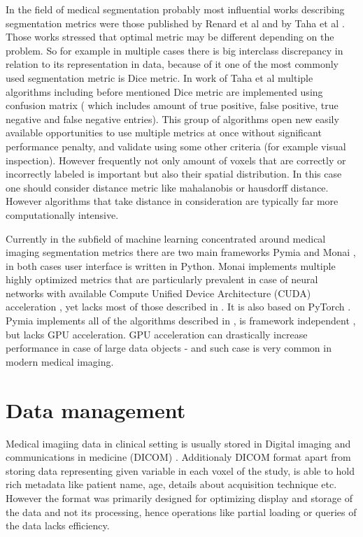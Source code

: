 \documentclass{juliacon}
\begin{document}
In the field of medical segmentation probably most influential works describing segmentation metrics were those published by Renard et al \cite{Nature} and by Taha et al \cite{TahaMainSegm}. Those works stressed that optimal metric may be different depending on the problem. So for example in multiple cases there is big interclass discrepancy in relation to its representation in data, because of it one of the most commonly used segmentation metric is Dice metric. In work of Taha et al \cite{TahaMainSegm} multiple algorithms including before mentioned Dice metric are implemented using confusion matrix ( which includes amount of true positive, false positive, true negative and false negative entries). This group of algorithms open new easily available opportunities to use multiple metrics at once without significant performance penalty, and validate using some other criteria (for example visual inspection). However frequently not only amount of voxels that are correctly or incorrectly labeled is important but also their spatial distribution. In this case one should consider distance metric like mahalanobis or hausdorff distance.  However algorithms that take distance in consideration are typically far more computationally intensive.

Currently in the subfield of machine learning concentrated around medical imaging segmentation metrics there are two main frameworks Pymia \cite{Pymia} and Monai \cite{MONAI}, in both cases user interface is written in Python. Monai \cite{MONAI} implements multiple  highly optimized metrics that are particularly prevalent in case of neural networks with available Compute Unified Device Architecture (CUDA) acceleration , yet lacks most of those described in \cite{TahaMainSegm}. It is also based on PyTorch \cite{pytorch}. Pymia \cite{Pymia} implements all of the algorithms described in  \cite{TahaMainSegm}, is framework independent , but lacks GPU acceleration. GPU acceleration can drastically increase performance in case of large data objects - and such case is very common in modern medical imaging. 


\section{Data management}
Medical imagiing data in clinical setting is usually stored in Digital imaging and communications in medicine (DICOM)  \cite{dicom}. Additionaly DICOM format apart from storing data representing given variable in each voxel of the study, is able to hold rich metadata like patient name, age, details about acquisition technique etc.  However the format was primarily designed for optimizing display and storage of the data and not its processing, hence operations like partial loading or queries of the data lacks efficiency.
\end{document}
